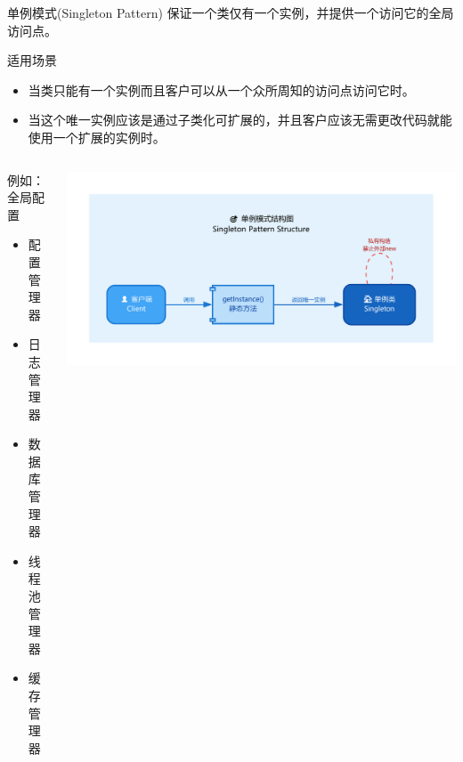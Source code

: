 \documentclass[UTF8,aspectratio=169]{beamer}
\begin{document}
\begin{frame}{单例模式(Singleton Pattern)}
    保证一个类仅有一个实例，并提供一个访问它的全局访问点。
    \begin{ytublock}{适用场景}
        \begin{itemize}
            \item 当类只能有一个实例而且客户可以从一个众所周知的访问点访问它时。
            \item 当这个唯一实例应该是通过子类化可扩展的，并且客户应该无需更改代码就能使用一个扩展的实例时。
        \end{itemize}
    \end{ytublock}
    \begin{columns}
        \begin{column}{0.30\textwidth}
            \begin{ytublock}{例如：全局配置}
                \begin{itemize}
                    \item 配置管理器
                    \item 日志管理器
                    \item 数据库管理器
                    \item 线程池管理器
                    \item 缓存管理器
                \end{itemize}
            \end{ytublock}
        \end{column}
        \begin{column}{0.68\textwidth}
            \includegraphics[width=1.0\textwidth]{images/singleton_pattern.pdf}
        \end{column}
    \end{columns}
\end{frame}
\end{document}
